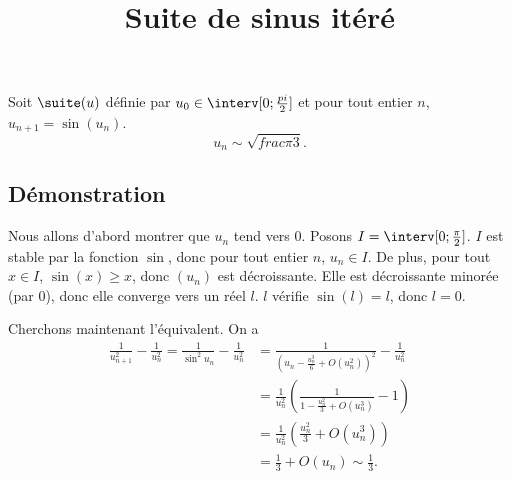 \documentclass[fontsize=12pt,twoside=false,parskip=half, french]{scrartcl}
\title{Suite de sinus itéré}
\date{}
\author{}
\begin{document}
\maketitle
   \begin{Theoreme}
      Soit $\suite(u)$ définie par $u_0 \in \interv[0; \frac{pi}{2}]$ et pour tout entier $n$, $u_{n + 1} = \sin(u_n)$.
      \[
         u_n \sim \sqrt{frac{\pi}{3}}.
      \]
   \end{Theoreme}
   \subsection{Démonstration}
      Nous allons d’abord montrer que $u_n$ tend vers 0. Posons $I = \interv[0; \frac{\pi}{2}]$.
      $I$ est stable par la fonction $\sin$, donc pour tout entier $n$, $u_n \in I$. De plus,
      pour tout $x \in I$, $\sin(x) \geq x$, donc $(u_n)$ est décroissante. Elle est 
      décroissante minorée (par $0$), donc elle converge vers un réel $l$. $l$ vérifie 
      $\sin(l) = l$, donc $l = 0$.
      
      Cherchons maintenant l’équivalent. On a 
      \begin{align*}
         \frac{1}{u_{n + 1}^2} - \frac{1}{u_n^2} = \frac{1}{\sin^2 u_n} - \frac{1}{u_n^2} &= \frac{1}{\left(u_n - \frac{u_n^3}{6} + O(u_n^2)\right)^2} - \frac{1}{u_n^2}\\
                                                 &= \frac{1}{u_n^2} \left( \frac{1}{1 - \frac{u_n^2}{3} + O(u_n^3)} - 1\right)\\
                                                 &= \frac{1}{u_n^2} \left( \frac{u_n^2}{3} + O(u_n^3) \right)\\
                                                 &= \frac{1}{3} + O(u_n) \sim \frac{1}{3}.                                                
      \end{align*}
      
\end{document}
